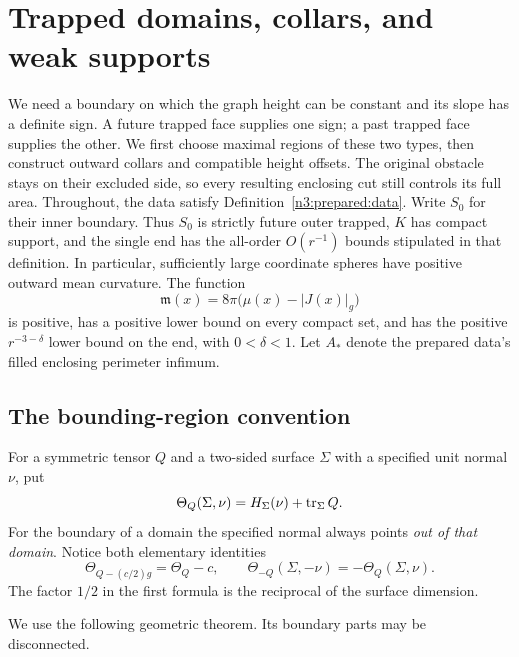 \section{Trapped domains, collars, and weak supports}
\label{n3:domains:section}

We need a boundary on which the graph height can be constant and its
slope has a definite sign. A future trapped face supplies one sign; a
past trapped face supplies the other. We first choose maximal regions
of these two types, then construct outward collars and compatible
height offsets. The original obstacle stays on their excluded side,
so every resulting enclosing cut still controls its full area.
Throughout, the data satisfy
Definition~\ref{n3:prepared:data}.  Write $S_0$ for their inner
boundary.  Thus $S_0$ is strictly future outer trapped, $K$ has compact
support, and the single end has the all-order $O(r^{-1})$ bounds stipulated
in that definition.  In particular, sufficiently large coordinate spheres
have positive outward mean curvature.  The function
\begin{equation}\label{n3:domains:margin}
 \mathfrak m(x)=8\pi\bigl(\mu(x)-|J(x)|_g\bigr)
\end{equation}
is positive, has a positive lower bound on every compact set, and has
the positive $r^{-3-\delta}$ lower bound on the end, with $0<\delta<1$.  Let $A_*$ denote the prepared data's
filled enclosing perimeter infimum.

\subsection{The bounding-region convention}

For a symmetric tensor $Q$ and a two-sided surface $\Sigma$ with a
specified unit normal $\nu$, put
\begin{equation}\label{n3:domains:expansion}
 \Theta_Q(\Sigma,\nu)
   =H_\Sigma(\nu)+\operatorname{tr}_\Sigma Q.
\end{equation}
For the boundary of a domain the specified normal always points
\emph{out of that domain}.  Notice both elementary identities
\begin{equation}\label{n3:domains:shift-reversal}
 \Theta_{Q-(c/2)g}=\Theta_Q-c,
 \qquad
 \Theta_{-Q}(\Sigma,-\nu)=-\Theta_Q(\Sigma,\nu).
\end{equation}
The factor $1/2$ in the first formula is the reciprocal of the surface
dimension.

We use the following geometric theorem.  Its boundary parts may be
disconnected.

